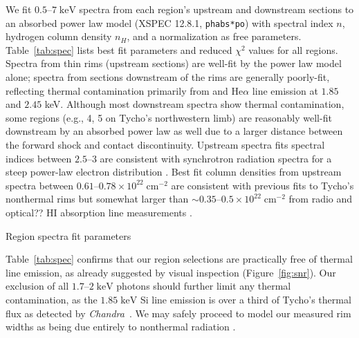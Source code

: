 \documentclass[iop, apj, numberedappendix, twocolappendix]{emulateapj}
\newcommand*{\mt}{\mathrm}
\newcommand*{\unit}[1]{\;\mt{#1}}  %
\newcommand*{\abt}{\mathord{\sim}} %
\newcommand*{\Chandra}{\textit{Chandra}\ }
\begin{document}
We fit $0.5$--$7 \unit{keV}$ spectra from each region's upstream and downstream
sections to an absorbed power law model (XSPEC 12.8.1, \texttt{phabs*po}) with
spectral index $n$, hydrogen column density $n_H$, and a normalization as free
parameters.  Table~\ref{tab:spec} lists best fit parameters and reduced
$\chi^2$ values for all regions.  Spectra from thin rims (upstream sections)
are well-fit by the power law model alone; spectra from sections downstream of
the rims are generally poorly-fit, reflecting thermal contamination primarily
from  and  He$\alpha$ line emission at $1.85$ and $2.45$
keV.  Although most downstream spectra show thermal contamination, some regions
(e.g., 4, 5 on Tycho's northwestern limb) are reasonably well-fit downstream by
an absorbed power law as well due to a larger distance between the forward
shock and contact discontinuity.
Upstream spectra fits spectral indices between $2.5$--$3$ are consistent with
synchrotron radiation spectra for a steep power-law electron distribution
\citep{vink2012}. Best fit column densities from
upstream spectra between $0.61$--$0.78 \times 10^{22} \unit{cm^{-2}}$ are
consistent with previous fits to Tycho's nonthermal rims \citep{hwang2002} but
somewhat larger than $\abt0.35$--$0.5 \times 10^{22} \unit{cm^{-2}}$ from radio
and optical??  HI absorption line measurements \citep{black1984, albinson1986,
kothes2004}.

\begin{table}
    \scriptsize
    \centering
    \caption{Region spectra fit parameters\label{tab:spec}}
    
\end{table}

Table~\ref{tab:spec} confirms that our region selections are practically free
of thermal line emission, as already suggested by visual inspection
(Figure~\ref{fig:snr}).  Our exclusion of all $1.7$--$2
\unit{keV}$ photons should further limit any thermal contamination, as
the $1.85 \unit{keV}$ Si line emission is over a third of Tycho's thermal flux
as detected by \Chandra \citep{hwang2002}.  We may safely proceed to model our
measured rim widths as being due entirely to nonthermal radiation
.

\end{document}
